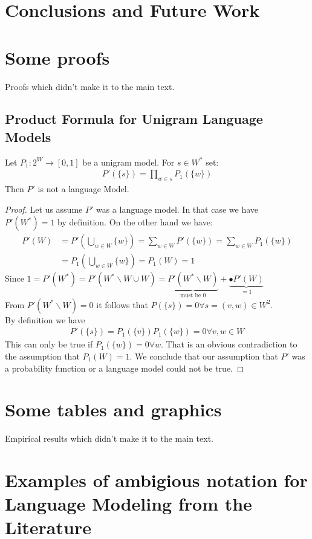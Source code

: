 \documentclass[•]{book}
\begin{document}
\chapter{Conclusions and Future Work}

\begin{appendix}
\chapter{Some proofs}\label{a:proofs}
Proofs which didn't make it to the main text.
\section*{Product Formula for Unigram Language Models}
\begin{theorem}
Let $P_1:2^W\longrightarrow[0,1]$ be a unigram model. For $s\in W^{*}$ set:
\begin{align}
P'(\{s\})= \prod_{w\in s}P_1(\{w\})
\end{align} 
Then $P'$ is not a language Model.
\end{theorem}
\begin{proof}
Let us assume $P'$ was a language model. In that case we have  $P'(W^{*}) =1$ by definition. On the other hand we have:
\begin{align}
P'(W) & = P'(\bigcup_{w\in W}\{w\})= \sum_{w\in W}P'(\{w\}) = \sum_{w\in W}P_1(\{w\}) \\
 & = P_1(\bigcup_{w\in W}\{w\})= P_1(W) = 1
\end{align}
Since $1 = P'(W^{*}) = P'(W^{*}\backslash W \cup W)= \underbrace{ P'(W^{*}\backslash W)}_{\text{must be }0} + \underbrace{•P'(W)}_{=1}$  \\
From $P'(W^{*}\backslash W)=0$ it follows that $P(\{s\}) = 0 \forall s=(v,w)\in W^2$.\\
By definition we have 
\begin{align}
P'(\{s\})=P_1(\{v\})P_1(\{w\})  = 0 \forall v,w \in W
\end{align}
This can only be true if $P_1(\{w\}) = 0 \forall w$. That is an obvious contradiction to the assumption that $P_1(W)=1$. We conclude that our assumption that $P'$ was a probability function or a language model could not be true.
\end{proof}

\chapter{Some tables and graphics}
Empirical results which didn't make it to the main text.

\chapter{Examples of ambigious notation for Language Modeling from the Literature}\label{a:ambigiousNotation}

\end{appendix}

\glsaddall
\printnoidxglossaries



\end{document}
